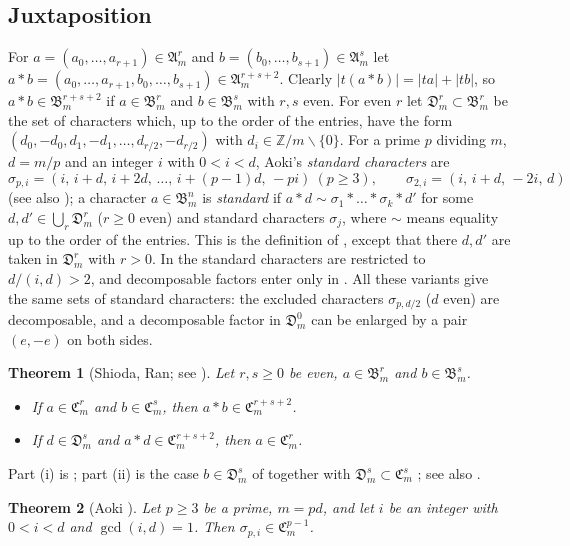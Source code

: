 \documentclass[11pt]{amsart}
\newtheorem{theorem}{Theorem}[section]
\theoremstyle{definition}
\theoremstyle{remark}
\numberwithin{equation}{section}
\newcommand{\Z}{\mathbb{Z}}
\newcommand{\fA}{\mathfrak{A}}
\newcommand{\fB}{\mathfrak{B}}
\newcommand{\fC}{\mathfrak{C}}
\newcommand{\fD}{\mathfrak{D}}
\newcommand{\sm}{\smallsetminus}
\begin{document}
\subsection{Juxtaposition}\label{subsec:juxta}
For $a=(a_0,\dots,a_{r+1})\in\fA^r_m$ and $b=(b_0,\dots,b_{s+1})\in\fA^s_m$ let $a*b=(a_0,\dots,a_{r+1},b_0,\dots,b_{s+1})\in\fA^{r+s+2}_m$. Clearly $|t(a*b)|=|ta|+|tb|$, so $a*b\in\fB^{r+s+2}_m$ if $a\in\fB^r_m$ and $b\in\fB^s_m$ with $r,s$ even. For even $r$ let $\fD^r_m\subset\fB^r_m$ be the set of characters which, up to the order of the entries, have the form $(d_0,-d_0,d_1,-d_1,\dots,d_{r/2},-d_{r/2})$ with $d_i\in\Z/m\sm\{0\}$. For a prime $p$ dividing $m$, $d=m/p$ and an integer $i$ with $0<i<d$, Aoki's \emph{standard characters} are
\[
\sigma_{p,i}=(i,\,i+d,\,i+2d,\,\dots,\,i+(p-1)d,\,-pi)\ (p\ge3),\qquad \sigma_{2,i}=(i,\,i+d,\,-2i,\,d)
\]
\cite[Section~2]{Ao00} (see also \cite[p.~387]{Ao87}); a character $a\in\fB^n_m$ is \emph{standard} if $a*d\sim\sigma_1*\dots*\sigma_k*d'$ for some $d,d'\in\bigcup_r\fD^r_m$ ($r\ge0$ even) and standard characters $\sigma_j$, where $\sim$ means equality up to the order of the entries. This is the definition of \cite[Section~2]{Ao00}, except that there $d,d'$ are taken in $\fD^r_m$ with $r>0$. In \cite[p.~387]{Ao87} the standard characters are restricted to $d/(i,d)>2$, and decomposable factors enter only in \cite[Thms.~1-2, 1-3]{Ao87}. All these variants give the same sets of standard characters: the excluded characters $\sigma_{p,d/2}$ ($d$ even) are decomposable, and a decomposable factor in $\fD^0_m$ can be enlarged by a pair $(e,-e)$ on both sides.

\begin{theorem}[{Shioda, Ran; see \cite[Thm.~1-4]{Ao87}}]\label{thm:juxta}
Let $r,s\ge0$ be even, $a\in\fB^r_m$ and $b\in\fB^s_m$.
\begin{itemize}
\item[(i)] If $a\in\fC^r_m$ and $b\in\fC^s_m$, then $a*b\in\fC^{r+s+2}_m$.
\item[(ii)] If $d\in\fD^s_m$ and $a*d\in\fC^{r+s+2}_m$, then $a\in\fC^r_m$.
\end{itemize}
\end{theorem}

Part (i) is \cite[Corollary to Thm.~II, (i)]{Sh79}; part (ii) is the case $b\in\fD^s_m$ of \cite[Lemma~3]{Sh79} together with $\fD^s_m\subset\fC^s_m$ \cite[Thm.~1-1]{Ao87}; see also \cite[Lemma~4.1]{Ao00}.

\begin{theorem}[{Aoki \cite[Thm.~2-1]{Ao87}}]\label{thm:aoki}
Let $p\ge3$ be a prime, $m=pd$, and let $i$ be an integer with $0<i<d$ and $\gcd(i,d)=1$. Then $\sigma_{p,i}\in\fC^{p-1}_m$.
\end{theorem}
\end{document}
